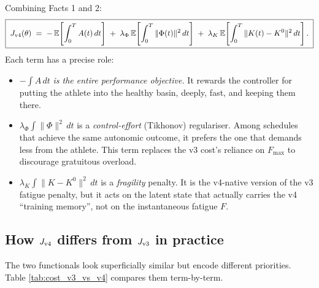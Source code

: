 Combining Facts 1 and 2:
\begin{equation}
\boxed{\;
J_{\rm v4}(\theta) \;=\; -\,\mathbb{E}\!\left[\int_0^T A(t)\, dt\right] \;+\; \lambda_\Phi\, \mathbb{E}\!\left[\int_0^T \|\Phi(t)\|^2\, dt\right] \;+\; \lambda_K\, \mathbb{E}\!\left[\int_0^T \|K(t) - K^0\|^2\, dt\right].
\;}
\label{eq:v4-cost}
\end{equation}
Each term has a precise role:
\begin{itemize}
  \item $-\int A\, dt$ \emph{is the entire performance objective.} It rewards the controller for putting the athlete into the healthy basin, deeply, fast, and keeping them there.
  \item $\lambda_\Phi \int \|\Phi\|^2\, dt$ is a \emph{control-effort} (Tikhonov) regulariser. Among schedules that achieve the same autonomic outcome, it prefers the one that demands less from the athlete. This term replaces the v3 cost's reliance on $F_{\max}$ to discourage gratuitous overload.
  \item $\lambda_K \int \|K - K^0\|^2\, dt$ is a \emph{fragility} penalty. It is the v4-native version of the v3 fatigue penalty, but it acts on the latent state that actually carries the v4 ``training memory'', not on the instantaneous fatigue $F$.
\end{itemize}

\subsection{How $J_{\rm v4}$ differs from $J_{\rm v3}$ in practice}

The two functionals look superficially similar but encode different priorities. Table \ref{tab:cost_v3_vs_v4} compares them term-by-term.

